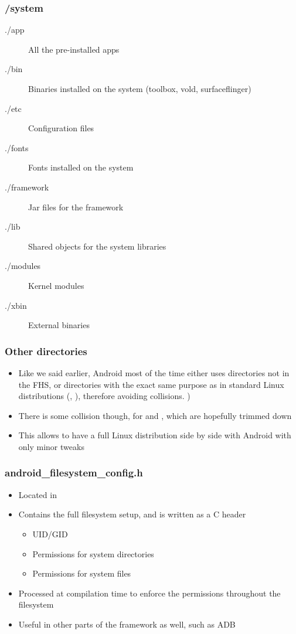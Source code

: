 \begin{frame}
  \frametitle{/system}
  \begin{description}
  \item[./app] All the pre-installed apps
  \item[./bin] Binaries installed on the system (toolbox, vold,
    surfaceflinger)
  \item[./etc] Configuration files
  \item[./fonts] Fonts installed on the system
  \item[./framework] Jar files for the framework
  \item[./lib] Shared objects for the system libraries
  \item[./modules] Kernel modules
  \item[./xbin] External binaries
  \end{description}
\end{frame}

\begin{frame}
  \frametitle{Other directories}
  \begin{itemize}
  \item Like we said earlier, Android most of the time either uses
    directories not in the FHS, or directories with the exact same purpose as in
    standard Linux distributions (, ), therefore avoiding collisions.
    )
  \item There is some collision though, for  and
    , which are hopefully trimmed down
  \item This allows to have a full Linux distribution side by side
    with Android with only minor tweaks
  \end{itemize}
\end{frame}

\begin{frame}
  \frametitle{android\_filesystem\_config.h}
  \begin{itemize}
  \item Located in 
  \item Contains the full filesystem setup, and is written as a
    C header
    \begin{itemize}
    \item UID/GID
    \item Permissions for system directories
    \item Permissions for system files
    \end{itemize}
  \item Processed at compilation time to enforce the permissions throughout
    the filesystem
  \item Useful in other parts of the framework as well, such as ADB
  \end{itemize}
\end{frame}
